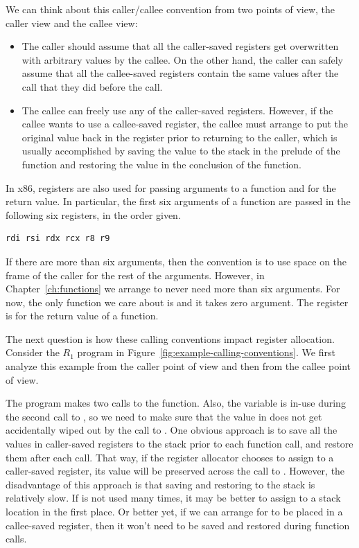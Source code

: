 \documentclass[11pt]{book}
\begin{document}
We can think about this caller/callee convention from two points of
view, the caller view and the callee view:
\begin{itemize}
\item The caller should assume that all the caller-saved registers get
  overwritten with arbitrary values by the callee.  On the other hand,
  the caller can safely assume that all the callee-saved registers
  contain the same values after the call that they did before the
  call.
\item The callee can freely use any of the caller-saved registers.
  However, if the callee wants to use a callee-saved register, the
  callee must arrange to put the original value back in the register
  prior to returning to the caller, which is usually accomplished by
  saving the value to the stack in the prelude of the function and
  restoring the value in the conclusion of the function.
\end{itemize}

In x86, registers are also used for passing arguments to a function
and for the return value.  In particular, the first six arguments of a
function are passed in the following six registers, in the order
given.
\begin{lstlisting}
rdi rsi rdx rcx r8 r9
\end{lstlisting}
If there are more than six arguments, then the convention is to use
space on the frame of the caller for the rest of the
arguments. However, in Chapter~\ref{ch:functions} we arrange to never
need more than six arguments. For now, the only function we care about
is  and it takes zero argument.
%
The register  is for the return value of a function.

The next question is how these calling conventions impact register
allocation. Consider the $R_1$ program in
Figure~\ref{fig:example-calling-conventions}.  We first analyze this
example from the caller point of view and then from the callee point
of view.

The program makes two calls to the  function.  Also, the
variable  is in-use during the second call to , so
we need to make sure that the value in  does not get
accidentally wiped out by the call to .  One obvious
approach is to save all the values in caller-saved registers to the
stack prior to each function call, and restore them after each
call. That way, if the register allocator chooses to assign 
to a caller-saved register, its value will be preserved across the
call to .  However, the disadvantage of this approach is
that saving and restoring to the stack is relatively slow. If 
is not used many times, it may be better to assign  to a stack
location in the first place. Or better yet, if we can arrange for
 to be placed in a callee-saved register, then it won't need
to be saved and restored during function calls.
\end{document}
